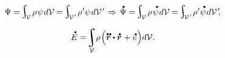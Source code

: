 \nopagebreak\en{\vspace{-0.6em}}\ru{\vspace{-0.3em}}\begin{equation*}
\Psi = \hspace{-0.25ex}\scalebox{1.4}{$\integral$}_{\hspace{-0.5ex}\raisemath{-0.05em}{\mathcal{V}}} \hspace{.3ex} \rho \hspace{.2ex} \psi \hspace{.2ex} d\mathcal{V} \hspace{-0.1ex}
= \hspace{-0.2ex} \scalebox{1.4}{$\integral$}_{\hspace{-0.5ex}\raisemath{-0.05em}{\mathcal{V}\hspace{.12ex}'}} \hspace{.2ex} \rho \hspace{.1ex}' \psi \hspace{.2ex} d\mathcal{V}\hspace{.2ex}'
\hspace{.2ex} \Rightarrow \hspace{.33ex}
\mathdotabove{\Psi} = \hspace{-0.25ex}\scalebox{1.4}{$\integral$}_{\hspace{-0.5ex}\raisemath{-0.05em}{\mathcal{V}}} \hspace{.3ex} \rho \hspace{.2ex} \mathdotabove{\psi} \hspace{.2ex} d\mathcal{V} \hspace{-0.1ex}
= \hspace{-0.2ex} \scalebox{1.4}{$\integral$}_{\hspace{-0.5ex}\raisemath{-0.05em}{\mathcal{V}\hspace{.12ex}'}} \hspace{.2ex} \rho \hspace{.1ex}' \mathdotabove{\psi} \hspace{.2ex} d\mathcal{V}\hspace{.2ex}'\hspace{-0.5ex} ,
\end{equation*}

\vspace{-0.1em}\noindent
{}

\nopagebreak\vspace{-0.2em}
\begin{equation}\label{rateofinternalenergychange}
\mathdotabove{E} = \hspace{-0.44ex} \integral\displaylimits_{\mathcal{V}} \hspace{-0.5ex} \rho \hspace{.2ex} \Bigl(
\mathdotdotabove{\currentlocationvector} \dotp \mathdotabove{\currentlocationvector} \hspace{.1ex}
+ \hspace{.1ex} \mathdotabove{e} \hspace{.1ex}
\Bigr) d\mathcal{V} .
\end{equation}

